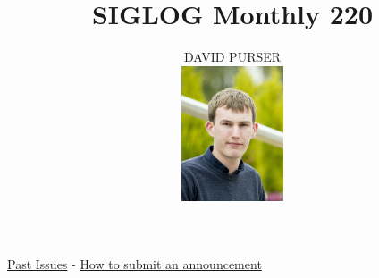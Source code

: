 \documentclass[prodmode,acmtecs]{acmsmall} %
\newcounter{colstart}
\begin{document}
\setcounter{colstart}{\thepage}

\title{\huge\sc SIGLOG Monthly 220}
\author{DAVID PURSER
\vspace*{-2.6cm}\begin{flushright}\includegraphics[width=30mm]{dp}\end{flushright}
}

\maketitlee

\href{https://lics.siglog.org/newsletters/}{Past Issues}
 - 
\href{https://lics.siglog.org/newsletters/inst.html}{How to submit an announcement}
\end{document}
